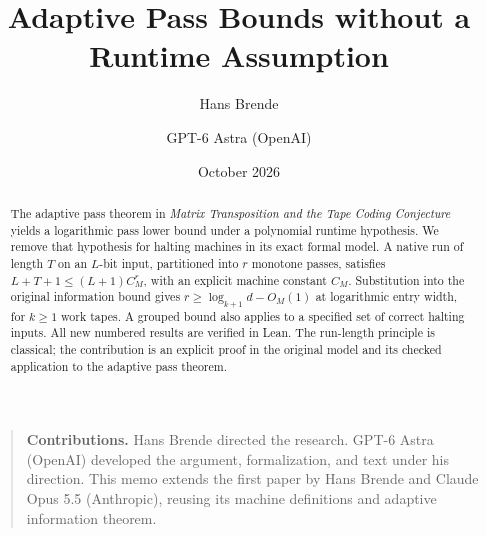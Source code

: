 \documentclass[11pt]{article}
\title{Adaptive Pass Bounds without a Runtime Assumption}
\author{Hans Brende \and GPT-6 Astra (OpenAI)}
\date{October 2026}
\numberwithin{equation}{section}
\begin{document}
\maketitle
\begin{abstract}
The adaptive pass theorem in \emph{Matrix Transposition and the Tape Coding
Conjecture} yields a logarithmic pass lower bound under a polynomial runtime
hypothesis. We remove that hypothesis for halting machines in its exact
formal model. A native run of length $T$ on an $L$-bit input, partitioned
into $r$ monotone passes, satisfies $L+T+1\le(L+1)C_M^r$, with an explicit
machine constant $C_M$. Substitution into the original information bound
gives $r\ge\log_{k+1}d-O_M(1)$ at logarithmic entry width, for $k\ge1$ work
tapes. A grouped bound also applies to a specified set of correct halting
inputs. All new numbered results are verified in Lean. The run-length
principle is classical; the contribution is an explicit proof in the
original model and its checked application to the adaptive pass theorem.
\end{abstract}
\begin{quote}\small
\textbf{Contributions.} Hans Brende directed the research. GPT-6 Astra
(OpenAI) developed the argument, formalization, and text under his direction.
This memo extends the first paper by Hans Brende and Claude Opus 5.5
(Anthropic), reusing its machine definitions and adaptive information theorem.
\end{quote}
\tableofcontents

\clearpage
\appendix




\end{document}
